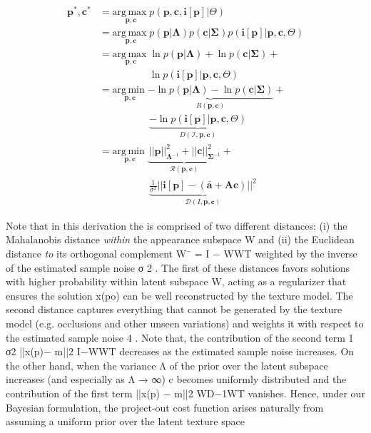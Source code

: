 \begin{equation}
    \begin{aligned}
        \mathbf{p}^*, \mathbf{c}^* & = \underset{\mathbf{p}, \mathbf{c}}{\mathrm{arg\,max\;}} p(\mathbf{p}, \mathbf{c}, \mathbf{i}[\mathbf{p}] | \Theta) 
        \\
        & = \underset{\mathbf{p}, \mathbf{c}}{\mathrm{arg\,max\;}}  p(\mathbf{p} | \mathbf{\Lambda})  p(\mathbf{c} | \mathbf{\Sigma}) p(\mathbf{i}[\mathbf{p}] |
        \mathbf{p}, \mathbf{c}, \Theta)  
        \\
        & = \underset{\mathbf{p}, \mathbf{c}}{\mathrm{arg\,max\;}}  \ln p(\mathbf{p} | \mathbf{\Lambda}) + \ln p(\mathbf{c} | \mathbf{\Sigma}) +
        \\
        & \qquad \qquad \quad \ln p(\mathbf{i}[\mathbf{p}] | \mathbf{p}, \mathbf{c}, \Theta)
        \\
        & = \underset{\mathbf{p}, \mathbf{c}}{\mathrm{arg\,min\;}}  \underbrace{-\ln p(\mathbf{p} | \mathbf{\Lambda}) -\ln p(\mathbf{c} | \mathbf{\Sigma})}_{R(\mathbf{p}, \mathbf{c})} +
        \\
        & \qquad \qquad \quad \underbrace{-\ln p(\mathbf{i}[\mathbf{p}] | \mathbf{p}, \mathbf{c}, \Theta)}_{D(\mathcal{I}, \mathbf{p}, \mathbf{c})}
        \\
        & = \underset{\mathbf{p}, \mathbf{c}}{\mathrm{arg\,min\;}}  \underbrace{\frac{}{} ||\mathbf{p}||^2_{\mathbf{\Lambda}^{-1}} + ||\mathbf{c}||^2_{\mathbf{\Sigma}^{-1}}}_{\mathcal{R}(\mathbf{p}, \mathbf{c})} +
        \\
        & \qquad \qquad \quad  \underbrace{ \frac{1}{\sigma^2} || \mathbf{i}[\mathbf{p}] - (\mathbf{\bar{a}} + \mathbf{A} \mathbf{c}) ||^2}_{\mathcal{D}(I, \mathbf{p}, \mathbf{c})} 
    \end{aligned}
    \label{eq:prob_aam_fitting}
\end{equation}

Note that in this derivation the is comprised of two different distances: (i) the Mahalanobis distance \emph{within}
the appearance subspace W and (ii) the Euclidean distance
\emph{to} its orthogonal complement W¯ = I − WWT
weighted by the inverse of the estimated sample noise σ
2
.
The first of these distances favors solutions with higher
probability within latent subspace W, acting as a regularizer
that ensures the solution x(po) can be well reconstructed
by the texture model. The second distance captures
everything that cannot be generated by the texture model
(e.g. occlusions and other unseen variations) and weights it
with respect to the estimated sample noise 4
.
Note that, the contribution of the second term 1
σ2 ||x(p)−
m||2
I−WWT decreases as the estimated sample noise increases.
On the other hand, when the variance Λ of the
prior over the latent subspace increases (and especially as
Λ → ∞) c becomes uniformly distributed and the contribution
of the first term ||x(p) − m||2
WD−1WT vanishes.
Hence, under our Bayesian formulation, the project-out
cost function arises naturally from assuming a uniform prior over the latent texture space
